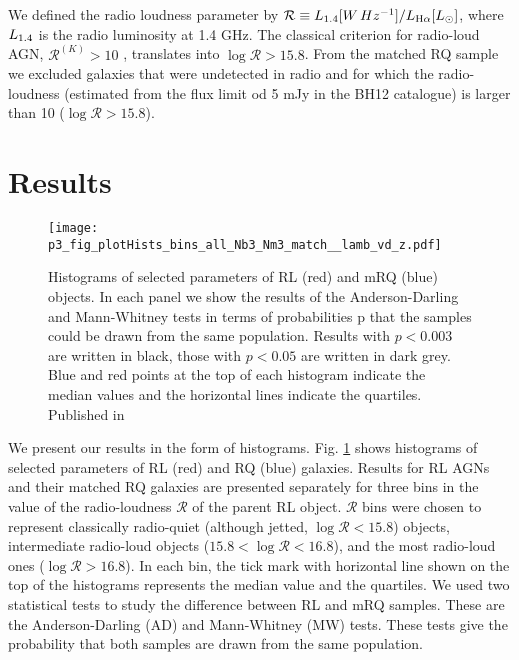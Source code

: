 \documentclass[utf8]{frontiersSCNS}
\newcommand{\Ha}{\ifmmode {\rm H}\alpha \else H$\alpha$\fi}
\begin{document}
We defined the radio loudness parameter by ${\mathcal R} \equiv L_{\rm 1.4} [W\, Hz^{-1}] / L_{\Ha} [ L_{\odot}]$, where $L_{\rm 1.4}$ is the radio luminosity at 1.4 GHz.
The classical criterion for radio-loud AGN, ${\mathcal R}^{(K)} > 10$ \citep{Kellermann.etal.1989a}, translates into $\log {\mathcal R} > 15.8$. From the matched RQ sample we excluded galaxies that were undetected in radio and for which the radio-loudness (estimated from the flux limit od 5 mJy in the BH12 catalogue) is larger than 10 ($\log {\mathcal R} > 15.8$). 

\section{Results}


\begin{figure}[h!]
\begin{center}
\texttt{[image: p3\_fig\_plotHists\_bins\_all\_Nb3\_Nm3\_match\_\_lamb\_vd\_z.pdf]}
\end{center}
\caption{Histograms of selected parameters of RL (red) and mRQ (blue) objects. In each panel we show the results of the Anderson-Darling and Mann-Whitney tests in terms of probabilities p that the samples could be drawn from the same population. Results with $p<0.003$ are written in black, those with $p< 0.05$ are written in dark grey. Blue and red points at the top of each histogram indicate the median values and the horizontal lines indicate the quartiles. Published in \citet{KozielWierzbowska.etal.2017a}}\label{fig:2}
\end{figure}

We present our results in the form of histograms. Fig. \ref{fig:2} shows histograms of selected parameters of RL (red) and RQ (blue) galaxies. Results for RL AGNs and their matched RQ galaxies are presented separately for three bins in the value of the radio-loudness ${\mathcal R}$ of the parent RL object. ${\mathcal R}$ bins were chosen to represent classically radio-quiet (although jetted, $\log {\mathcal R} < 15.8 $) objects, intermediate radio-loud objects ($15.8 < \log {\mathcal R} < 16.8$), and the most radio-loud ones ($\log {\mathcal R} > 16.8$). In each bin, the tick mark with horizontal line shown on the top of the histograms represents the median value and the quartiles. We used two statistical tests to study the difference between RL and mRQ samples. These are the Anderson-Darling (AD) and Mann-Whitney (MW) tests. These tests give the probability that both samples are drawn from the same population. 
\end{document}
